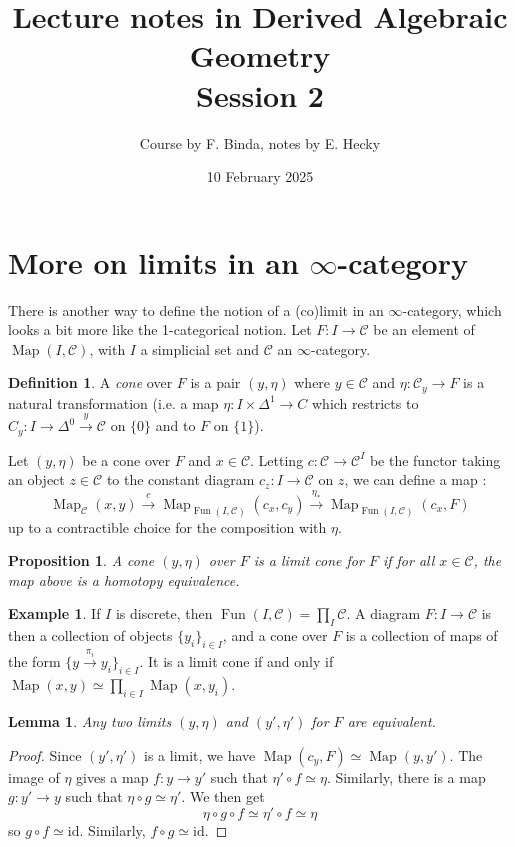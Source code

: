 \documentclass[11pt]{article}
\title{Lecture notes in Derived Algebraic Geometry\\Session 2}
\date{10 February 2025}
\author{Course by F. Binda, notes by E. Hecky}
\newtheorem{proposition}[theorem]{Proposition}
\newtheorem{lemma}[theorem]{Lemma}
\theoremstyle{definition}
\newtheorem{definition}[theorem]{Definition}
\newtheorem{example}[theorem]{Example}
\newcommand{\C}{\mathcal{C}}
\newcommand{\Fun}{\operatorname{Fun}}
\newcommand{\Map}{\operatorname{Map}}
\begin{document}
\maketitle

\section{More on limits in an $\infty$-category}

There is another way to define the notion of a (co)limit in an $\infty$-category, which looks a bit more like the 1-categorical notion.
Let $F : I \to \C$ be an element of $\Map(I, \C)$, with $I$ a simplicial set and $\C$ an $\infty$-category.
\begin{definition}
    A \emph{cone} over $F$ is a pair $(y, \eta)$ where $y \in \C$ and $\eta : \C_y \to F$ is a natural transformation (i.e. a map $\eta : I \times \Delta^1 \to C$ which restricts to $C_y : I \to \Delta^0 \xrightarrow{y} \C$ on $\{0\}$ and to $F$ on $\{1\}$).
\end{definition}

Let $(y, \eta)$ be a cone over $F$ and $x \in \C$.
Letting $c : \C \to \C^I$ be the functor taking an object $z \in \C$ to the constant diagram $c_z : I \to \C$ on $z$, we can define a map :
\[
    \Map_{\C}(x, y) \xrightarrow{c} \Map_{\Fun(I, \C)}(c_x, c_y) \xrightarrow{\eta_*} \Map_{\Fun(I, \C)}(c_x, F)
\]
up to a contractible choice for the composition with $\eta$.

\begin{proposition}
    A cone $(y, \eta)$ over $F$ is a limit cone for $F$ if for all $x \in \C$, the map above is a homotopy equivalence.
\end{proposition}

\begin{example}
    If $I$ is discrete, then $\Fun(I, \C) = \prod_I \C$.
    A diagram $F : I \to \C$ is then a collection of objects $\{y_i\}_{i \in I}$, and a cone over $F$ is a collection of maps of the form $\{y \xrightarrow{\pi_i} y_i\}_{i \in I}$.
    It is a limit cone if and only if $\Map(x, y) \simeq \prod_{i \in I} \Map(x, y_i)$.
\end{example}

\begin{lemma}
    Any two limits $(y, \eta)$ and $(y', \eta')$ for $F$ are equivalent.
\end{lemma}
\begin{proof}
    Since $(y', \eta')$ is a limit, we have $\Map(c_y, F) \simeq \Map(y, y')$.
    The image of $\eta$ gives a map $f : y \to y'$ such that $\eta' \circ f \simeq \eta$.
    Similarly, there is a map $g : y' \to y$ such that $\eta \circ g \simeq \eta'$.
    We then get
    \[
        \eta \circ g \circ f \simeq \eta' \circ f \simeq \eta
    \]
    so $g \circ f \simeq \mathrm{id}$. Similarly, $f \circ g \simeq \mathrm{id}$.
\end{proof}
\end{document}
